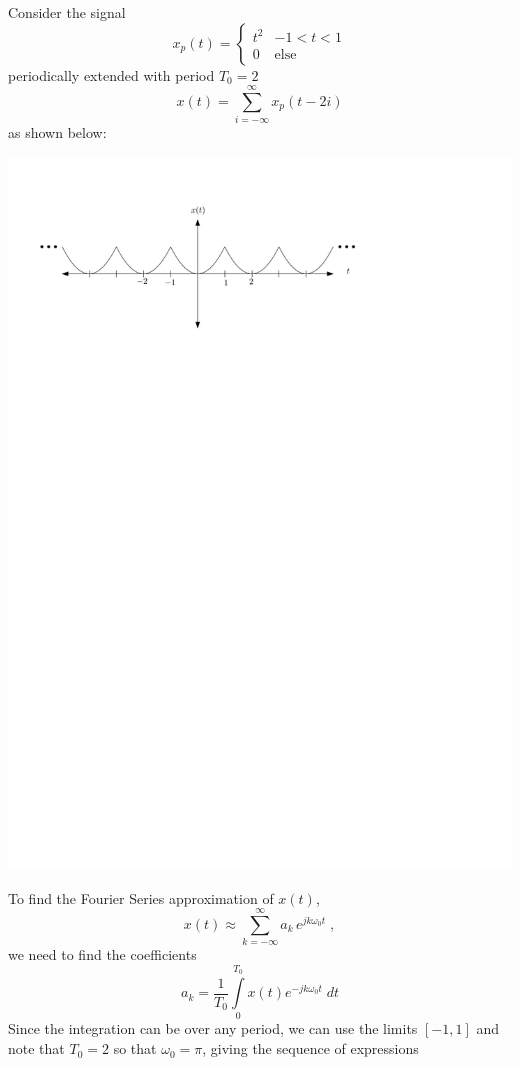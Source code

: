 \begin{example}
  Consider the signal
  \[
  x_p(t) = \left\{ \begin{array}{lc}
    t^2 & -1 < t < 1\\
    0 & \mbox{else}
  \end{array}
\right.
\]
periodically extended with period $T_0 = 2$
\[
x(t) = \sum\limits_{i = -\infty}^{\infty} x_p(t - 2i) 
\]
as shown below:
\begin{center}
  \includegraphics[scale=1]{graphics/ctfs-example1.pdf}
\end{center}
To find the Fourier Series approximation of $x(t)$,
\[
x(t) \approx \sum\limits_{k = -\infty}^{\infty} a_k \, e^{j k\omega_0 t}\; ,
\]
we need to find the coefficients
\[
a_k = \frac{1}{T_0} \int\limits_{0}^{T_0} x(t)e^{-jk\omega_0 t} \; dt
\]
Since the integration can be over any period, we can use the limits $[-1,1]$ and note that $T_0 = 2$ so that $\omega_0 = \pi$, giving the sequence of expressions

\end{example}
